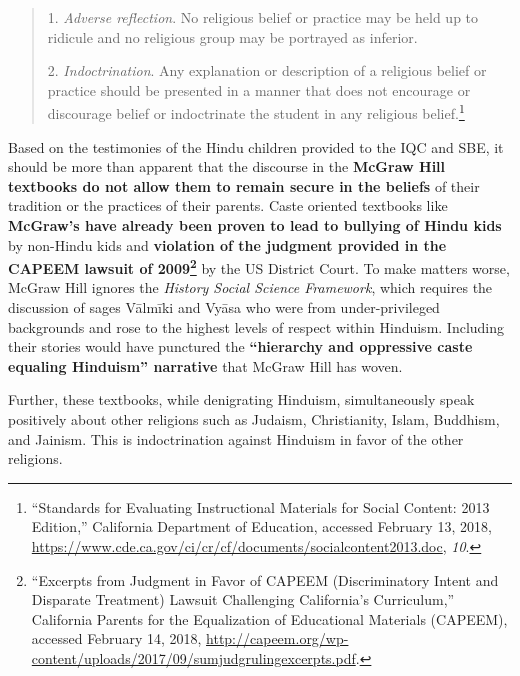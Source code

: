 \begin{quote}
1. \textit{Adverse reflection}. No religious belief or practice may be held up to ridicule and no religious group may be portrayed as inferior.

2. \textit{Indoctrination}. Any explanation or description of a religious belief or practice should be presented in a manner that does not encourage or discourage belief or indoctrinate the student in any religious belief.\footnote{“Standards for Evaluating Instructional Materials for Social Content: 2013 Edition,” California Department of Education, accessed February 13, 2018, \url{https://www.cde.ca.gov/ci/cr/cf/documents/socialcontent2013.doc}, \textit{10}.}
\end{quote}
Based on the testimonies of the Hindu children provided to the IQC and SBE, it should be more than apparent that the discourse in the \textbf{McGraw Hill textbooks do not allow them to remain secure in the beliefs} of their tradition or the practices of their parents. Caste oriented textbooks like \textbf{McGraw’s have already been proven to lead to bullying of Hindu kids} by non-Hindu kids and \textbf{violation of the judgment provided in the CAPEEM lawsuit of 2009\footnote{“Excerpts from Judgment in Favor of CAPEEM (Discriminatory Intent and Disparate Treatment) Lawsuit Challenging California’s Curriculum,” California Parents for the Equalization of Educational Materials (CAPEEM), accessed February 14, 2018, \url{http://capeem.org/wp-content/uploads/2017/09/sumjudgrulingexcerpts.pdf}.}} by the US District Court. To make matters worse, McGraw Hill ignores the \textit{History Social Science Framework}, which requires the discussion of sages Vālmīki and Vyāsa who were from under-privileged backgrounds and rose to the highest levels of respect within Hinduism. Including their stories would have punctured the \textbf{“hierarchy and oppressive caste equaling Hinduism” narrative} that McGraw Hill has woven.
\vskip 2pt

Further, these textbooks, while denigrating Hinduism, simultaneously speak positively about other religions such as Judaism, Christianity, Islam, Buddhism, and Jainism. This is indoctrination against Hinduism in favor of the other religions.
\vskip 2pt

